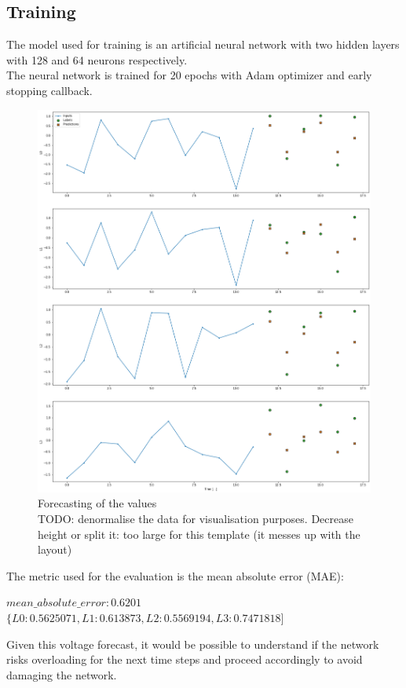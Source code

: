 \subsection{Training}
The model used for training is an artificial neural network with two hidden layers with 128 and 64 neurons respectively.\\
The neural network is trained for 20 epochs with Adam optimizer and early stopping callback.

\begin{figure}[H]
    \centering
    \includegraphics[width=.9\linewidth]{images/GYM-ANM/DATASET PLOTS/lines_forecasting.png}
    \caption[GYM-ANM forecasting]{Forecasting of the values \\
    TODO: denormalise the data for visualisation purposes. Decrease height or split it: too large for this template (it messes up with the layout)}
    \label{fig:net_sit3}
\end{figure}

\noindent The metric used for the evaluation is the mean absolute error (\gls{MAE}):
\begin{algorithmic}
\State $mean\_absolute\_error: 0.6201$
\State $\{L0:0.5625071, L1:0.613873 , L2:0.5569194, L3:0.7471818]$
\end{algorithmic}

\noindent Given this voltage forecast, it would be possible to understand if the network risks overloading for the next time steps and proceed accordingly to avoid damaging the network.



